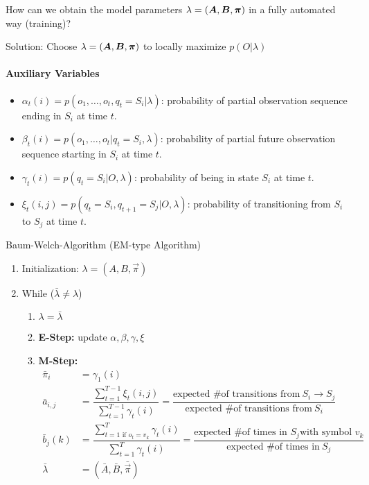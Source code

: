 How can we obtain the model parameters \(\lambda = (\bm{A}, \bm{B}, \bm{\pi})\) in a fully automated way (training)?

Solution: Choose \(\lambda = (\bm{A}, \bm{B}, \bm{\pi})\) to locally maximize $p(O|\lambda)$

\paragraph{Auxiliary Variables}
\begin{itemize}
	\item $\alpha_t(i) = p(o_1,\dots, o_t, q_t=S_i|\lambda)$: probability of partial observation sequence ending in $S_i$ at time $t$.
	\item $\beta_t(i) = p(o_1,\dots, o_t | q_t=S_i, \lambda)$: probability of partial future observation sequence starting in $S_i$ at time $t$.
	\item $\gamma_t(i) = p(q_t=S_i|O, \lambda)$: probability of being in state $S_i$ at time $t$.
	\item $\xi_t(i,j) = p(q_t=S_i, q_{t+1}=S_j|O, \lambda)$: probability of transitioning from $S_i$ to $S_j$ at time $t$.
\end{itemize}

\begin{algorithm}[H]
\caption[Baum-Welch-Algorithm]{Baum-Welch-Algorithm (EM-type Algorithm)}
\begin{enumerate}
    \item Initialization: \(\lambda = (A, B, \vec{\pi})\)
    \item While ($\bar{\lambda} \neq \lambda$) {
		\begin{enumerate}
			\item $\lambda = \bar{\lambda}$
			\item \textbf{E-Step:} update $\alpha, \beta, \gamma, \xi$
			\item \textbf{M-Step:}
			\begin{align*}
				\bar{\pi}_i &= \gamma_1(i) \\
				\bar{a}_{i,j} &= \dfrac{\sum_{t=1}^{T-1} \xi_t(i,j)}{\sum_{t=1}^{T-1} \gamma_t(i)} = \dfrac{\text{expected \# of transitions from} \ S_i \rightarrow S_j}{\text{expected \# of transitions from} \ S_i} \\
				\bar{b}_{j}(k) &= \dfrac{\sum_{t=1 \text{ if } o_t=v_k}^{T} \gamma_t(i)}{\sum_{t=1}^{T} \gamma_t(i)} = \dfrac{\text{expected \# of times in }S_j \text{with symbol }v_k}{\text{expected \# of times in} \ S_j} \\
				\bar{\lambda} &= (\bar{A}, \bar{B}, \bar{\vec{\pi}})
			\end{align*}
		\end{enumerate}
		}
\end{enumerate}
\end{algorithm}


